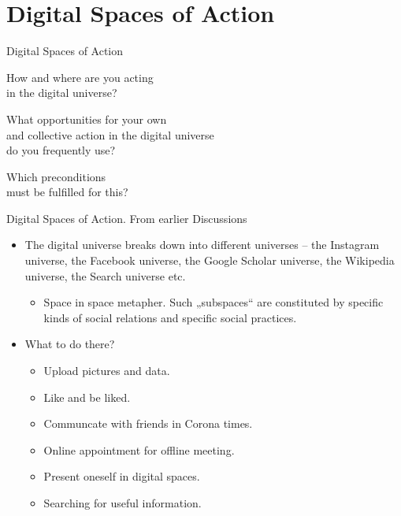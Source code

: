 \documentclass{beamer}
\begin{document}
\section{Digital Spaces of Action}
\begin{frame}{Digital Spaces of Action}\centering\Large\bf

  How and where are you acting\\ in the digital universe?

  What opportunities for your own\\ and collective action in the digital
  universe\\ do you frequently use?

  Which preconditions\\ must be fulfilled for this?
\end{frame}
\begin{frame}{Digital Spaces of Action. From earlier Discussions}
  \begin{itemize}
  \item The digital universe breaks down into different universes -- the
    Instagram universe, the Facebook universe, the Google Scholar universe,
    the Wikipedia universe, the Search universe etc.
    \begin{itemize}
    \item Space in space metapher. Such „subspaces“ are constituted by specific
      kinds of social relations and specific social practices.
    \end{itemize}
  \item What to do there?
    \begin{itemize}
    \item Upload pictures and data.
    \item Like and be liked.
    \item Communcate with friends in Corona times.
    \item Online appointment for offline meeting.
    \item Present oneself in digital spaces.
    \item Searching for useful information.
    \end{itemize}
  \end{itemize}
\end{frame}
\end{document}
